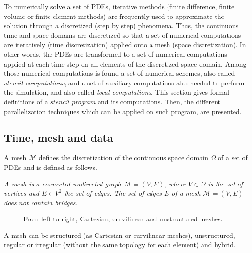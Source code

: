 To numerically solve a set of PDEs, iterative methods (finite difference, finite volume or finite element methods) are frequently used to approximate the solution through a discretized (step by step) phenomena. Thus, the continuous time and space domains are discretized so that a set of numerical computations are iteratively (time discretization) applied onto a mesh (space discretization). In other words, the PDEs are transformed to a set of numerical computations applied at each time step on all elements of the discretized space domain. Among those numerical computations is found a set of numerical schemes, also called \textit{stencil computations}, and a set of auxiliary computations also needed to perform the simulation, and also called \emph{local computations}.
This section gives formal definitions of a \textit{stencil program} and its computations. Then, the different parallelization techniques which can be applied on such program, are presented.

\subsection{Time, mesh and data}

A mesh $\mathcal{M}$ defines the discretization of the continuous space domain $\Omega$ of a set of PDEs and is defined as follows. 

\begin{mydef}
\textit{A mesh is a connected undirected graph $\mathcal{M}=(V,E)$, where $V\in \Omega$ is the set of vertices and $E\in V^2$ the set of edges. The set of edges $E$ of a mesh $\mathcal{M}=(V,E)$ does not contain bridges.}
\end{mydef}
\begin{figure}[!h]\begin{center}
  \caption{From left to right, Cartesian, curvilinear and unstructured meshes.}
  \label{fig:mesh}
\end{center}\end{figure}
A mesh can be structured (as Cartesian or curvilinear meshes), unstructured, regular or irregular (without the same topology for each element) and hybrid. 

